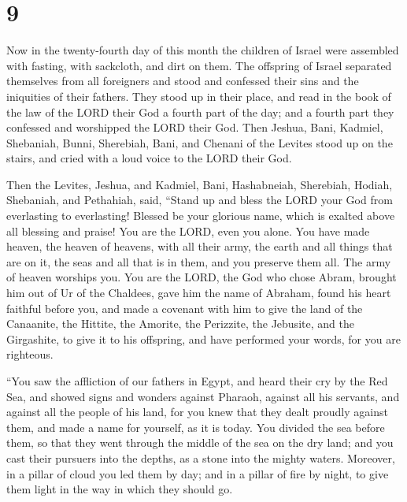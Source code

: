 \hypertarget{section-8}{%
\section{9}\label{section-8}}

 Now in the twenty-fourth day of this month the children
of Israel were assembled with fasting, with sackcloth, and dirt on them.
 The offspring of Israel separated themselves from all
foreigners and stood and confessed their sins and the iniquities of
their fathers.  They stood up in their place, and read in
the book of the law of the LORD their God a fourth part of the day; and
a fourth part they confessed and worshipped the LORD their God.
 Then Jeshua, Bani, Kadmiel, Shebaniah, Bunni, Sherebiah,
Bani, and Chenani of the Levites stood up on the stairs, and cried with
a loud voice to the LORD their God.

 Then the Levites, Jeshua, and Kadmiel, Bani, Hashabneiah,
Sherebiah, Hodiah, Shebaniah, and Pethahiah, said, ``Stand up and bless
the LORD your God from everlasting to everlasting! Blessed be your
glorious name, which is exalted above all blessing and praise!
 You are the LORD, even you alone. You have made heaven,
the heaven of heavens, with all their army, the earth and all things
that are on it, the seas and all that is in them, and you preserve them
all. The army of heaven worships you.  You are the LORD,
the God who chose Abram, brought him out of Ur of the Chaldees, gave him
the name of Abraham,  found his heart faithful before you,
and made a covenant with him to give the land of the Canaanite, the
Hittite, the Amorite, the Perizzite, the Jebusite, and the Girgashite,
to give it to his offspring, and have performed your words, for you are
righteous.

 ``You saw the affliction of our fathers in Egypt, and
heard their cry by the Red Sea,  and showed signs and
wonders against Pharaoh, against all his servants, and against all the
people of his land, for you knew that they dealt proudly against them,
and made a name for yourself, as it is today.  You
divided the sea before them, so that they went through the middle of the
sea on the dry land; and you cast their pursuers into the depths, as a
stone into the mighty waters.  Moreover, in a pillar of
cloud you led them by day; and in a pillar of fire by night, to give
them light in the way in which they should go.

